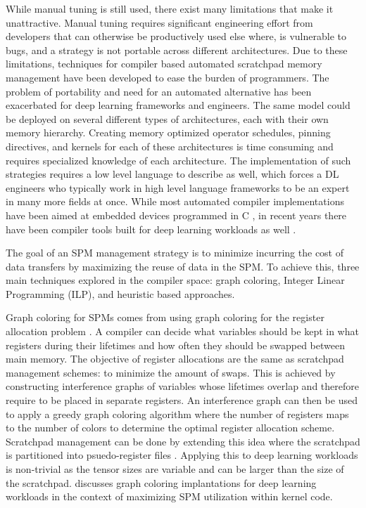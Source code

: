 While manual tuning is still used, there exist many limitations that make it
unattractive. Manual tuning requires significant engineering effort from
developers that can otherwise be productively used else where, is vulnerable to
bugs, and a strategy is not portable across different architectures.  Due to
these limitations, techniques for compiler based automated scratchpad memory
management have been developed to ease the burden of programmers. The problem
of portability and need for an automated alternative has been exacerbated for
deep learning frameworks and engineers. The same model could be deployed on
several different types of architectures, each with their own memory hierarchy.
Creating memory optimized operator schedules, pinning directives, and kernels
for each of these architectures is time consuming and requires specialized
knowledge of each architecture. The implementation of such strategies requires
a low level language to describe as well, which forces a DL engineers who
typically work in high level language frameworks to be an expert in many more
fields at once.  While most automated compiler implementations have been aimed
at embedded devices programmed in C \cite{graphColoring} \cite{memoryColoring},
in recent years there have been compiler tools built for deep learning
workloads as well \cite{onsram} \cite{toplib}.

The goal of an SPM management strategy is to minimize incurring the cost of
data transfers by maximizing the reuse of data in the SPM. To achieve this,
three main techniques explored in the compiler space: graph coloring, Integer
Linear Programming (ILP), and heuristic based approaches.

Graph coloring for SPMs comes from using graph coloring for the register
allocation problem \cite{registerAllocation} \cite{graphColoring}.  A compiler
can decide what variables should be kept in what registers during their
lifetimes and how often they should be swapped between main memory.  The
objective of register allocations are the same as scratchpad management
schemes: to minimize the amount of swaps. This is achieved by constructing
interference graphs of variables whose lifetimes overlap and therefore require
to be placed in separate registers. An interference graph can then be used to
apply a greedy graph coloring algorithm where the number of registers maps to
the number of colors to determine the optimal register allocation scheme.
Scratchpad management can be done by extending this idea where the scratchpad
is partitioned into psuedo-register files \cite{graphColoring}. Applying this
to deep learning workloads is non-trivial as the tensor sizes are variable and
can be larger than the size of the scratchpad. \cite{toplib} discusses graph
coloring implantations for deep learning workloads in the context of maximizing
SPM utilization within kernel code.

